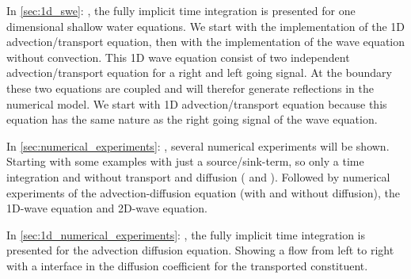 In \autoref{sec:1d_swe}: , the fully implicit time integration is presented for one dimensional shallow water equations.
We start with the implementation of the 1D advection/transport equation, then with the implementation of the wave equation without convection.
This 1D wave equation consist of two independent advection/transport equation for a right and left going signal.
At the boundary these two equations are coupled and will therefor generate reflections in the numerical model.
We start with 1D advection/transport equation because this equation has the same nature as the right going signal of the wave equation.


In \autoref{sec:numerical_experiments}: , several numerical experiments will be shown.
Starting with some examples with just a source/sink-term, so only a time integration and without transport and diffusion ( and ).
Followed by numerical experiments of the advection-diffusion equation (with and without diffusion), the 1D-wave equation and 2D-wave equation.

In \autoref{sec:1d_numerical_experiments}: , the fully implicit time integration is presented for the advection diffusion equation.
Showing a flow from left to right with a interface in the diffusion coefficient for the transported constituent.


